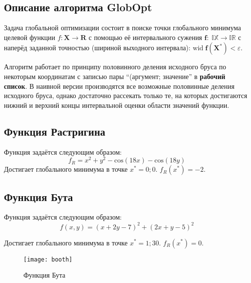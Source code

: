 \subsection{Описание алгоритма GlobOpt}

Задача глобальной оптимизации состоит в поиске точки глобального минимума целевой функции $f: \mathbf{X} \rightarrow \mathbf{R}$ с помощью её интервального сужения $\mathbf{f}: \; \mathbb{IX} \rightarrow \mathbb{IR}$ с наперёд заданной точностью (шириной выходного интервала): $\textrm{wid} \; \mathbf{f(X^*)} < \varepsilon$.

Алгоритм \cite{globopt} работает по принципу половинного деления исходного бруса по некоторым координатам с записью пары ``(аргумент; значение'' в \textbf{рабочий список}. В наивной версии производятся все возможные половинные деления исходного бруса, однако достаточно рассекать только те, на которых достигаются нижний и верхний концы интервальной оценки области значений функции.

\subsection{Функция Растригина}
Функция задаётся следующим образом:
\begin{equation}
f_R = x^2 + y ^ 2 - \textrm{cos}(18x) - \textrm{cos}(18y)
\end{equation}
Достигает глобального минимума в точке $x^*={0;0}$. $f_R(x^*)=-2$.

\subsection{Функция Бута}
Функция задаётся следующим образом:
\begin{equation}
f(x, y) = (x + 2y - 7) ^ 2 + (2x + y - 5) ^ 2
\end{equation}

Достигает глобального минимума в точке $x^*={1;30}$. $f_R(x^*)=0$.

\begin{figure}[H]
	\begin{center}
		\texttt{[image: booth]}
		\label{pic:degenmat}
		\caption{Функция Бута}
	\end{center}
\end{figure}
